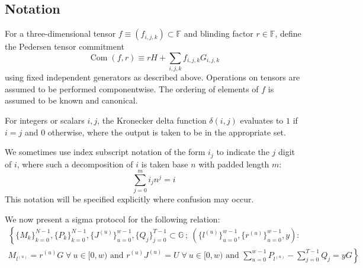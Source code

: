 \documentclass[draft]{article} %
\newcommand{\G}{\mathbb{G}}
\newcommand{\F}{\mathbb{F}}
\newcommand{\com}{\operatorname{Com}}
\begin{document}
\subsection{Notation}
For a three-dimensional tensor $f \equiv (f_{i,j,k}) \subset \F$ and blinding factor $r \in \F$, define the Pedersen tensor commitment
$$\com(f,r) \equiv rH + \sum_{i,j,k} f_{i,j,k} G_{i,j,k}$$
using fixed independent generators as described above.
Operations on tensors are assumed to be performed componentwise.
The ordering of elements of $f$ is assumed to be known and canonical.

For integers or scalars $i,j$, the Kronecker delta function $\delta(i,j)$ evaluates to $1$ if $i=j$ and $0$ otherwise, where the output is taken to be in the appropriate set.

We sometimes use index subscript notation of the form $i_j$ to indicate the $j$ digit of $i$, where such a decomposition of $i$ is taken base $n$ with padded length $m$:
$$\sum_{j=0}^m i_j n^j = i$$
This notation will be specified explicitly where confusion may occur.

We now present a sigma protocol for the following relation:
\begin{multline*}
\left\{ \{M_k\}_{k=0}^{N-1},\{P_k\}_{k=0}^{N-1},\{J^{(u)}\}_{u=0}^{w-1},\{Q_j\}_{j=0}^{T-1} \subset \G \: ; \: \left( \{l^{(u)}\}_{u=0}^{w-1}, \{r^{(u)}\}_{u=0}^{w-1}, y \right) : \right. \\
\left. M_{l^{(u)}} = r^{(u)}G \; \forall \: u \in [0,w) \text{ and } r^{(u)}J^{(u)} = U \; \forall \: u \in [0,w) \text{ and } \sum_{u=0}^{w-1} P_{l^{(u)}} - \sum_{j=0}^{T-1} Q_j = yG \right\}
\end{multline*}
\end{document}
